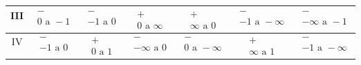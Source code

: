 \begin{table}[htb]
\begin{tabular}{|c|c|c|c|c|c|c|}
III       & $\begin{matrix}-\\ 0\,\, \mathrm{a}\,\, -1\end{matrix}$   & $\begin{matrix}-\\ -1\,\, \mathrm{a}\,\, 0\end{matrix}$   & $\begin{matrix}+\\ 0\,\, \mathrm{a}\,\, \infty\end{matrix}$   & $\begin{matrix}+\\ \infty\,\, \mathrm{a}\,\, 0\end{matrix}$   & $\begin{matrix}-\\ -1\,\, \mathrm{a}\,\, -\infty\end{matrix}$   & $\begin{matrix}-\\ -\infty\,\, \mathrm{a}\,\, -1\end{matrix}$   \\ \hline
IV        & $\begin{matrix}-\\ -1\,\, \mathrm{a}\,\, 0\end{matrix}$   & $\begin{matrix}+\\ 0\,\, \mathrm{a}\,\, 1\end{matrix}$   & $\begin{matrix}-\\ -\infty\,\, \mathrm{a}\,\, 0\end{matrix}$   & $\begin{matrix}-\\ 0\,\, \mathrm{a}\,\, -\infty\end{matrix}$   & $\begin{matrix}+\\ \infty\,\, \mathrm{a}\,\, 1\end{matrix}$   & $\begin{matrix}-\\ -1\,\, \mathrm{a}\,\, -\infty\end{matrix}$   \\ \hline
\end{tabular}
\end{table}


